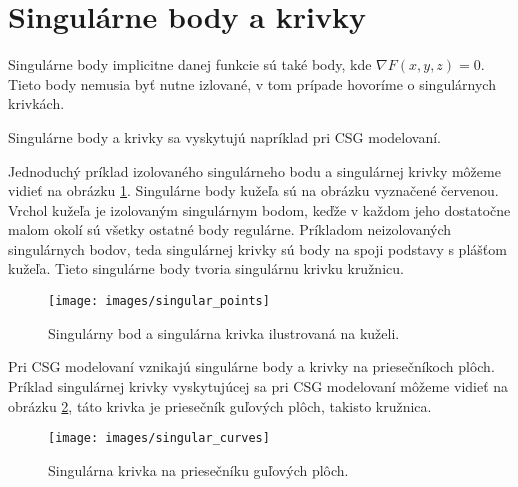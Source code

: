 \section{Singulárne body a krivky}

Singulárne body implicitne danej funkcie sú také body, kde $\nabla F(x, y, z) = 0$. Tieto body nemusia byť nutne izlované, 
v tom prípade hovoríme o singulárnych krivkách. 

Singulárne body a krivky sa vyskytujú napríklad pri CSG modelovaní. 

Jednoduchý príklad izolovaného singulárneho bodu a 
singulárnej krivky môžeme vidieť na obrázku \ref{obr:singular_points}. Singulárne
body kužeľa sú na obrázku vyznačené červenou. Vrchol kužeľa je izolovaným singulárnym bodom, keďže v 
každom jeho dostatočne malom okolí sú všetky ostatné body regulárne. Príkladom neizolovaných singulárnych
bodov, teda singulárnej krivky sú body na spoji podstavy s plášťom kužeľa. Tieto singulárne body tvoria 
singulárnu krivku kružnicu.

\begin{figure}
    \centerline{\texttt{[image: images/singular\_points]}}
    \caption[Singulárny bod a singulárna krivka]{Singulárny bod a singulárna krivka ilustrovaná na kuželi.}
    \label{obr:singular_points}
\end{figure}

Pri CSG modelovaní vznikajú singulárne body a krivky na priesečníkoch plôch. Príklad
singulárnej krivky vyskytujúcej sa pri CSG modelovaní môžeme vidieť na obrázku 
\ref{obr:singular_curves}, táto krivka je priesečník guľových plôch, takisto kružnica.

\begin{figure}
    \centerline{\texttt{[image: images/singular\_curves]}}
    \caption[Singulárna krivka na priesečníku guľových plôch]{Singulárna krivka na priesečníku guľových plôch.}
    \label{obr:singular_curves}
\end{figure}